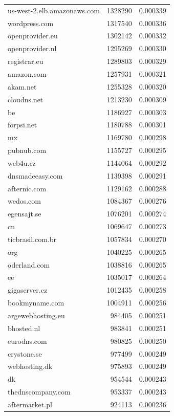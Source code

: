 \begin{tabular}{lrr}
us-west-2.elb.amazonaws.com & 1328290 & 0.000339 \\
wordpress.com & 1317540 & 0.000336 \\
openprovider.eu & 1302142 & 0.000332 \\
openprovider.nl & 1295269 & 0.000330 \\
registrar.eu & 1289803 & 0.000329 \\
amazon.com & 1257931 & 0.000321 \\
akam.net & 1255328 & 0.000320 \\
cloudns.net & 1213230 & 0.000309 \\
be & 1186927 & 0.000303 \\
forpsi.net & 1180788 & 0.000301 \\
mx & 1169780 & 0.000298 \\
pubnub.com & 1155727 & 0.000295 \\
web4u.cz & 1144064 & 0.000292 \\
dnsmadeeasy.com & 1139398 & 0.000291 \\
afternic.com & 1129162 & 0.000288 \\
wedos.com & 1084367 & 0.000276 \\
egensajt.se & 1076201 & 0.000274 \\
cn & 1069647 & 0.000273 \\
ticbrasil.com.br & 1057834 & 0.000270 \\
org & 1040225 & 0.000265 \\
oderland.com & 1038816 & 0.000265 \\
ee & 1035017 & 0.000264 \\
gigaserver.cz & 1012435 & 0.000258 \\
bookmyname.com & 1004911 & 0.000256 \\
argewebhosting.eu & 984405 & 0.000251 \\
bhosted.nl & 983841 & 0.000251 \\
eurodns.com & 980825 & 0.000250 \\
crystone.se & 977499 & 0.000249 \\
webhosting.dk & 975893 & 0.000249 \\
dk & 954544 & 0.000243 \\
thednscompany.com & 953337 & 0.000243 \\
aftermarket.pl & 924113 & 0.000236 \\
\bottomrule
\end{tabular}
